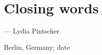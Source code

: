 \chapter*{Closing words}


\begin{flushright}--- Lydia Pintscher\end{flushright}
\begin{flushright}Berlin, Germany; date\end{flushright}
